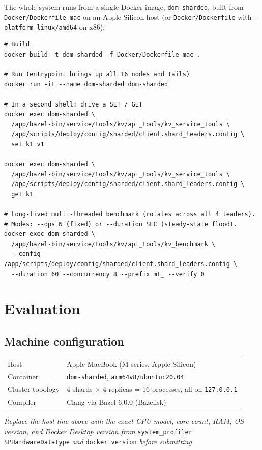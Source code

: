 \documentclass[11pt]{article}
\begin{document}
The whole system runs from a single Docker image, \texttt{dom-sharded}, built
from \texttt{Docker/Dockerfile\_mac} on an Apple Silicon host (or
\texttt{Docker/Dockerfile} with \texttt{--platform linux/amd64} on x86):

\begin{lstlisting}[style=shstyle,caption={Build and run.}]
# Build
docker build -t dom-sharded -f Docker/Dockerfile_mac .

# Run (entrypoint brings up all 16 nodes and tails)
docker run -it --name dom-sharded dom-sharded

# In a second shell: drive a SET / GET
docker exec dom-sharded \
  /app/bazel-bin/service/tools/kv/api_tools/kv_service_tools \
  /app/scripts/deploy/config/sharded/client.shard_leaders.config \
  set k1 v1

docker exec dom-sharded \
  /app/bazel-bin/service/tools/kv/api_tools/kv_service_tools \
  /app/scripts/deploy/config/sharded/client.shard_leaders.config \
  get k1

# Long-lived multi-threaded benchmark (rotates across all 4 leaders).
# Modes: --ops N (fixed) or --duration SEC (steady-state flood).
docker exec dom-sharded \
  /app/bazel-bin/service/tools/kv/api_tools/kv_benchmark \
  --config /app/scripts/deploy/config/sharded/client.shard_leaders.config \
  --duration 60 --concurrency 8 --prefix mt_ --verify 0
\end{lstlisting}

\section{Evaluation}

\subsection{Machine configuration}

\begin{tabular}{ll}
  \toprule
  Host             & Apple MacBook (M-series, Apple Silicon) \\
  Container        & \texttt{dom-sharded}, \texttt{arm64v8/ubuntu:20.04} \\
  Cluster topology & 4 shards $\times$ 4 replicas = 16 processes, all on \texttt{127.0.0.1} \\
  Compiler         & Clang via Bazel 6.0.0 (Bazelisk) \\
  \bottomrule
\end{tabular}

\medskip
\noindent\textit{Replace the host line above with the exact CPU model, core count,
RAM, OS version, and Docker Desktop version from} \texttt{system\_profiler
SPHardwareDataType} \textit{and} \texttt{docker version} \textit{before
submitting.}
\end{document}
